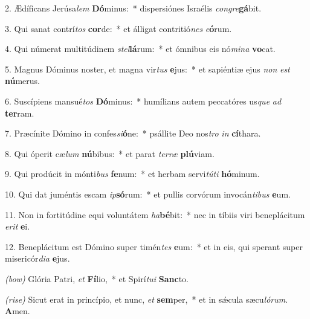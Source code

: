 2. Ædíficans Jerúsa\textit{lem} \textbf{Dó}minus:~* dispersiónes Israélis \textit{con}\textit{gre}\textbf{gá}bit.

3. Qui sanat contrí\textit{tos} \textbf{cor}de:~* et álligat contritió\textit{nes} \textit{e}\textbf{ó}rum.

4. Qui númerat multitúdinem \textit{stel}\textbf{lá}rum:~* et ómnibus eis nó\textit{mi}\textit{na} \textbf{vo}cat.

5. Magnus Dóminus noster, et magna vir\textit{tus} \textbf{e}jus:~* et sapiéntiæ ejus \textit{non} \textit{est} \textbf{nú}merus.

6. Suscípiens mansué\textit{tos} \textbf{Dó}minus:~* humílians autem peccatóres us\textit{que} \textit{ad} \textbf{ter}ram.

7. Præcínite Dómino in confes\textit{si}\textbf{ó}ne:~* psállite Deo nos\textit{tro} \textit{in} \textbf{cí}thara.

8. Qui óperit cæ\textit{lum} \textbf{nú}bibus:~* et parat \textit{ter}\textit{ræ} \textbf{plú}viam.

9. Qui prodúcit in mónti\textit{bus} \textbf{fe}num:~* et herbam servi\textit{tú}\textit{ti} \textbf{hó}minum.

10. Qui dat juméntis escam \textit{ip}\textbf{só}rum:~* et pullis corvórum invocán\textit{ti}\textit{bus} \textbf{e}um.

11. Non in fortitúdine equi voluntátem \textit{ha}\textbf{bé}bit:~* nec in tíbiis viri beneplácitum \textit{e}\textit{rit} \textbf{e}i.

12. Beneplácitum est Dómino super timén\textit{tes} \textbf{e}um:~* et in eis, qui sperant super misericór\textit{di}\textit{a} \textbf{e}jus.

\textit{(bow)} Glória Patri, \textit{et} \textbf{Fí}lio,~* et Spirí\textit{tu}\textit{i} \textbf{Sanc}to.

\textit{(rise)} Sicut erat in princípio, et nunc, \textit{et} \textbf{sem}per,~* et in s\'{\ae}cula sæcu\textit{ló}\textit{rum}. \textbf{A}men.